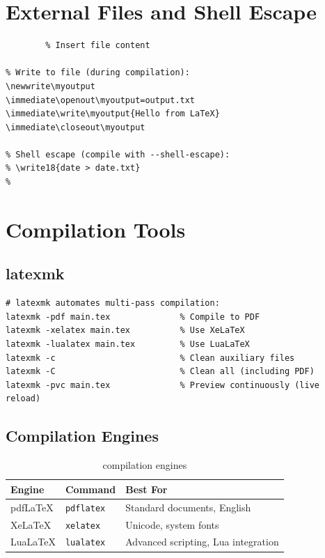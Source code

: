 \section{External Files and Shell Escape}

\begin{lstlisting}[language={[LaTeX]TeX}, caption=File operations]
% Read from external file:
        % Insert file content

% Write to file (during compilation):
\newwrite\myoutput
\immediate\openout\myoutput=output.txt
\immediate\write\myoutput{Hello from LaTeX}
\immediate\closeout\myoutput

% Shell escape (compile with --shell-escape):
% \write18{date > date.txt}
% 
\end{lstlisting}

\section{Compilation Tools}

\subsection{latexmk}

\begin{lstlisting}[caption=latexmk automation]
# latexmk automates multi-pass compilation:
latexmk -pdf main.tex              % Compile to PDF
latexmk -xelatex main.tex          % Use XeLaTeX
latexmk -lualatex main.tex         % Use LuaLaTeX
latexmk -c                         % Clean auxiliary files
latexmk -C                         % Clean all (including PDF)
latexmk -pvc main.tex              % Preview continuously (live reload)
\end{lstlisting}

\subsection{Compilation Engines}

\begin{table}[H]
\centering
\begin{tabular}{lll}
\toprule
\textbf{Engine} & \textbf{Command} & \textbf{Best For} \\
\midrule
pdfLaTeX  & \texttt{pdflatex}  & Standard documents, English \\
XeLaTeX   & \texttt{xelatex}   & Unicode, system fonts \\
LuaLaTeX  & \texttt{lualatex}  & Advanced scripting, Lua integration \\
\bottomrule
\end{tabular}
\caption{\latex{} compilation engines}
\end{table}

